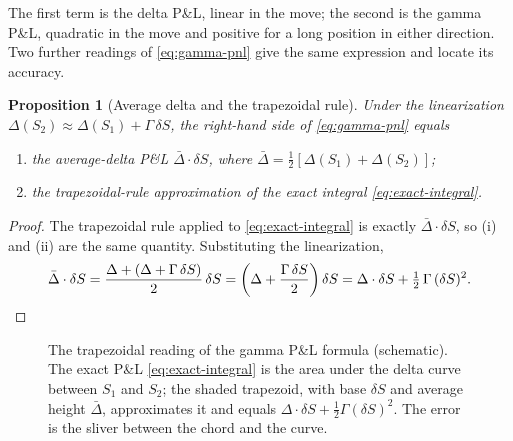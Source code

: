 \documentclass[11pt]{book}
\theoremstyle{plain}
\newtheorem{proposition}[theorem]{Proposition}
\theoremstyle{definition}
\theoremstyle{remark}
\begin{document}
The first term is the delta P\&L, linear in the move; the second is the gamma P\&L, quadratic in the move and positive for a long position in either direction. Two further readings of \eqref{eq:gamma-pnl} give the same expression and locate its accuracy.

\begin{proposition}[Average delta and the trapezoidal rule]
\label{prop:three-readings}
Under the linearization $\Delta(S_2) \approx \Delta(S_1) + \Gamma\,\delta S$, the right-hand side of \eqref{eq:gamma-pnl} equals
\begin{enumerate}[label=(\roman*)]
\item the average-delta P\&L $\bar\Delta\cdot\delta S$, where $\bar\Delta = \tfrac12\left[\Delta(S_1)+\Delta(S_2)\right]$;
\item the trapezoidal-rule approximation of the exact integral \eqref{eq:exact-integral}.
\end{enumerate}
\end{proposition}

\begin{proof}
The trapezoidal rule applied to \eqref{eq:exact-integral} is exactly $\bar\Delta\cdot\delta S$, so (i) and (ii) are the same quantity. Substituting the linearization,
\begin{equation}
\bar\Delta\cdot\delta S
= \frac{\Delta + (\Delta + \Gamma\,\delta S)}{2}\,\delta S
= \left(\Delta + \frac{\Gamma\,\delta S}{2}\right)\delta S
= \Delta\cdot\delta S + \tfrac12\,\Gamma\,(\delta S)^2 .
\qedhere
\end{equation}
\end{proof}

\begin{figure}[t]
\centering
{}
\caption{The trapezoidal reading of the gamma P\&L formula (schematic). The exact P\&L \eqref{eq:exact-integral} is the area under the delta curve between $S_1$ and $S_2$; the shaded trapezoid, with base $\delta S$ and average height $\bar\Delta$, approximates it and equals $\Delta\cdot\delta S + \tfrac12\Gamma(\delta S)^2$. The error is the sliver between the chord and the curve.}
\label{fig:trapezoid}
\end{figure}
\end{document}
